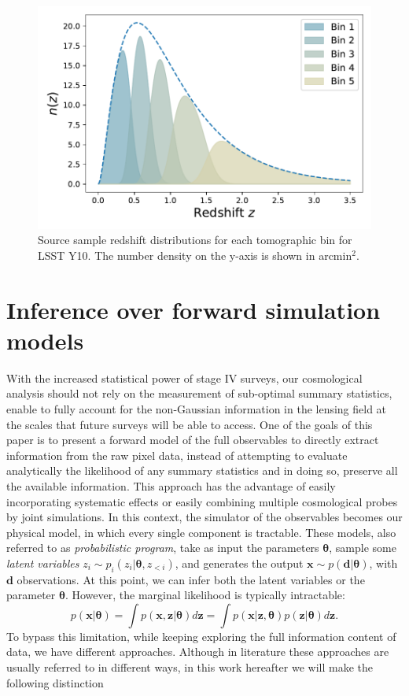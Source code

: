 \documentclass{aa}
\begin{document}
\begin{figure}
    \centering
    \includegraphics[width=\columnwidth]{figures/redshift_distribution_light.pdf}
    \caption{
     Source sample redshift distributions for each tomographic bin for LSST Y10. The number density on the y-axis is shown in arcmin$^2$.
    }
     \label{fig:redshift_distribution}
\end{figure}
\section{Inference over forward simulation models}
With the increased statistical power of stage IV surveys, our cosmological analysis should not rely on the measurement of sub-optimal summary statistics, enable to fully account for the non-Gaussian information in the lensing field at
the scales that future surveys will be able to access. One of the goals of this paper is to present a forward model of the full observables to directly extract information from the raw pixel data, instead of attempting to evaluate analytically the likelihood of any summary statistics and in doing so, preserve all the available information. 
This approach has the advantage of easily incorporating systematic effects or easily combining multiple cosmological probes by joint simulations.  
In this context, the simulator of the observables becomes our physical model, in which every single component is tractable. These models, also referred to as \textit{probabilistic program}, take as input the parameters $\bm{\theta}$, sample some \textit{latent variables} $z_i \sim p_i(z_i|\bm \theta, z_{<i})$, and generates the output $\bm x \sim p(\bm d|\bm \theta)$, with $\bm{d}$ observations. At this point, we can infer both the latent variables or the parameter $\bm{\theta}$. However,  the marginal likelihood is typically intractable:
\begin{equation}
    p(\bm{x}|\bm{\theta})=\int p(\bm{x},\bm{z}|\bm{\theta}) d\bm{z}=\int p(\bm{x}|\bm{z},\bm{\theta})p(\bm{z}|\bm{\theta}) d\bm{z}.
\end{equation}
To bypass this limitation, while keeping exploring the full information content of data, we have different approaches. Although in literature these approaches are usually referred to in different ways, in this work hereafter we will make the following distinction 
\end{document}
